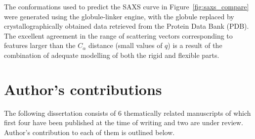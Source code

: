 \documentclass{doctoral}
\begin{document}
The conformations used to predict the SAXS curve in Figure~\ref{fig:saxs_compare} were generated using the globule-linker engine, with the globule replaced by crystallographically obtained data retrieved from the Protein Data Bank (PDB)\cite{rcsb_org}. The excellent agreement in the range of scattering vectors corresponding to features larger than the $C_{\alpha}$ distance (small values of $q$) is a result of the combination of adequate modelling of both the rigid and flexible parts.

\section{Author's contributions}
The following dissertation consists of 6 thematically related manuscripts of which first four have been published at the time of writing and two are under review. Author's contribution to each of them is outlined below.
\end{document}
